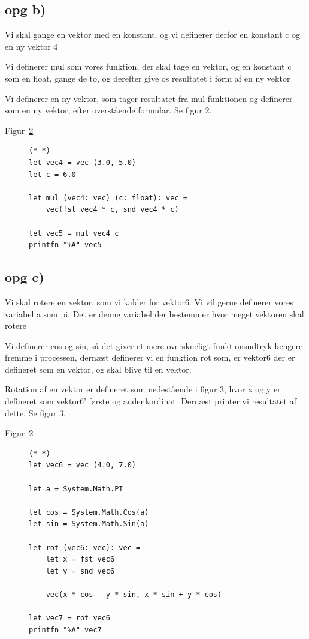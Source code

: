 \documentclass{article}
\begin{document}
\vspace{40mm}
\subsection{opg b)}
Vi skal gange en vektor med en konstant, og vi definerer derfor en konstant c og en ny vektor 4

Vi definerer mul som vores funktion, der skal tage en vektor, og en konstant c som en float, gange de to, og derefter give os resultatet i form af en ny vektor 

Vi definerer en ny vektor, som tager resultatet fra mul funktionen og definerer som en ny vektor, efter overstående formular. Se figur 2.

\vspace{20mm}
Figur~\ref{fig:fsharpCodeExample}
\begin{figure}
  \lstset{language=FSharp}
\begin{lstlisting}
(* *)
let vec4 = vec (3.0, 5.0)
let c = 6.0

let mul (vec4: vec) (c: float): vec =
    vec(fst vec4 * c, snd vec4 * c)

let vec5 = mul vec4 c
printfn "%A" vec5
\end{lstlisting}
  \caption{}
  \label{fig:fsharpCodeExample}
\end{figure}

\subsection{opg c)}
Vi skal rotere en vektor, som vi kalder for vektor6.
Vi vil gerne definerer vores variabel a som pi. Det er denne variabel der bestemmer hvor meget vektoren skal rotere



Vi definerer cos og sin, så det giver et mere overskueligt funktionsudtryk længere fremme i processen, dernæst
definerer vi en funktion rot som, er vektor6 der er defineret som en vektor, og skal blive til en vektor.



Rotation af en vektor er defineret som nedestående i figur 3, hvor x og y er defineret som vektor6' første og andenkordinat. Dernæst printer vi resultatet af dette. Se figur 3.

Figur~\ref{fig:fsharpCodeExample}
\begin{figure}
  \lstset{language=FSharp}
\begin{lstlisting}
(* *)
let vec6 = vec (4.0, 7.0)

let a = System.Math.PI

let cos = System.Math.Cos(a)
let sin = System.Math.Sin(a)

let rot (vec6: vec): vec =
    let x = fst vec6
    let y = snd vec6

    vec(x * cos - y * sin, x * sin + y * cos)

let vec7 = rot vec6
printfn "%A" vec7
\end{lstlisting}
  \caption{}
  \label{fig:fsharpCodeExample}
\end{figure}
\end{document}
